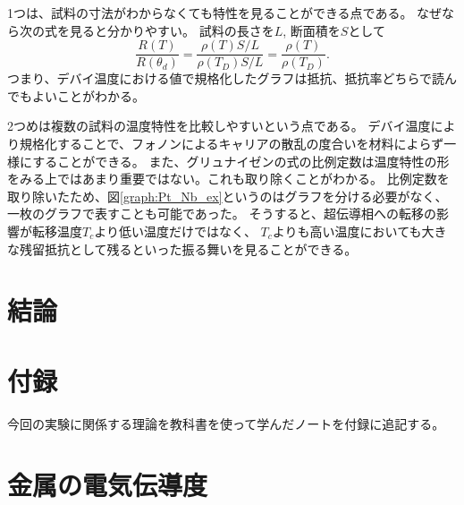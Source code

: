 \documentclass[11pt,dvipdfmx,a4paper]{jsarticle}
\begin{document}
1つは、試料の寸法がわからなくても特性を見ることができる点である。
なぜなら次の式を見ると分かりやすい。
試料の長さを\(L\), 断面積を\(S\)として
\begin{equation}
    \frac{R(T)}{R(\theta_d)} = \frac{\rho(T)S/L}{\rho(T_D)S/L} = \frac{\rho(T)}{\rho(T_D)}.
\end{equation}
つまり、デバイ温度における値で規格化したグラフは抵抗、抵抗率どちらで読んでもよいことがわかる。

2つめは複数の試料の温度特性を比較しやすいという点である。
デバイ温度により規格化することで、フォノンによるキャリアの散乱の度合いを材料によらず一様にすることができる。
また、グリュナイゼンの式の比例定数は温度特性の形をみる上ではあまり重要ではない。これも取り除くことがわかる。
比例定数を取り除いたため、図\ref{graph:Pt_Nb_ex}というのはグラフを分ける必要がなく、一枚のグラフで表すことも可能であった。
そうすると、超伝導相への転移の影響が転移温度\(T_c\)より低い温度だけではなく、
\(T_c\)よりも高い温度においても大きな残留抵抗として残るといった振る舞いを見ることができる。


\section{結論}





\section*{付録}
今回の実験に関係する理論を教科書\cite{ibach-luth}を使って学んだノートを付録に追記する。
\section{金属の電気伝導度}
\end{document}
